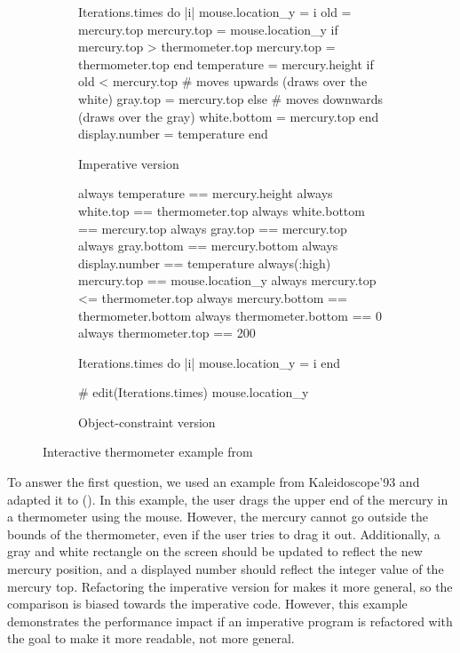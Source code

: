 \begin{figure}[b!]
    \begin{subfigure}[b]{0.48\textwidth}
      \begin{code}[basicstyle=\scriptsize,frame=none]
Iterations.times do |i|
  mouse.location_y = i
  old = mercury.top
  mercury.top = mouse.location_y
  if mercury.top > thermometer.top
    mercury.top = thermometer.top
  end
  temperature = mercury.height
  if old < mercury.top
    # moves upwards (draws over the white)
    gray.top = mercury.top
  else
    # moves downwards (draws over the gray)
    white.bottom = mercury.top
  end
  display.number = temperature
end
      \end{code}
      \caption{Imperative version}
    \end{subfigure}
    \begin{subfigure}[b]{0.52\textwidth}
      \centering
      \begin{code}[basicstyle=\scriptsize,numbers=none]
always { temperature == mercury.height }
always { white.top == thermometer.top }
always { white.bottom == mercury.top }
always { gray.top == mercury.top }
always { gray.bottom == mercury.bottom }
always { display.number == temperature }
always(:high) { mercury.top == mouse.location_y }
always { mercury.top <= thermometer.top }
always { mercury.bottom == thermometer.bottom }
always { thermometer.bottom == 0 }
always { thermometer.top == 200 }

Iterations.times do |i|
  mouse.location_y = i
end

# edit(Iterations.times) { mouse.location_y }
      \end{code}
      \caption{Object-constraint version}
    \end{subfigure}
  \caption{Interactive thermometer example from \cite{lopez-asi-1994}}
  \label{fig:thermometer-example}
\end{figure}

To answer the first question, we used an example from Kaleidoscope'93
\cite{lopez-asi-1994} and adapted it to \toolname
().  In this example, the user
drags the upper end of the mercury in a thermometer using the
mouse. However, the mercury cannot go outside the bounds of the
thermometer, even if the user tries to drag it out. Additionally, a
gray and white rectangle on the screen should be updated to reflect
the new mercury position, and a displayed number should reflect the
integer value of the mercury top. Refactoring the imperative version
for \langname makes it more general, so the comparison is biased
towards the imperative code. However, this example demonstrates the
performance impact if an imperative program is refactored with the
goal to make it more readable, not more general.

